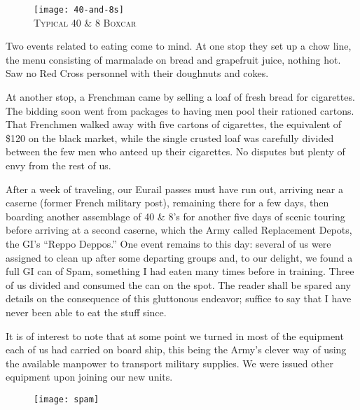 \documentclass[../m3y]{subfiles}
\begin{document}
\begin{figure}
\centering
\texttt{[image: 40-and-8s]}\\
\medskip
{\newtimes\textsc{Typical 40 \& 8 Boxcar}}
\end{figure}

Two events related to eating come to mind. At one stop they set up a chow line, the menu consisting of marmalade on bread and grapefruit juice, nothing hot. Saw no Red Cross personnel with their doughnuts and cokes.

At another stop, a Frenchman came by selling a loaf of fresh bread for cigarettes. The bidding soon went from packages to having men pool their rationed cartons. That  Frenchmen walked away with five cartons of cigarettes, the equivalent of \$120 on the black market, while the single crusted loaf was carefully divided between the few men who anteed up their cigarettes. No disputes but plenty of envy from the rest of us.

After a week of traveling, our Eurail passes must have run out, arriving near a caserne (former French military post), remaining there for a few days, then boarding another assemblage of 40 \& 8's for another five days of scenic touring before arriving at a second caserne, which the Army called Replacement Depots, the GI's ``Reppo Deppos.'' One event remains to this day: several of us were assigned to clean up after some departing groups and, to our delight, we found a full GI can of Spam, something I had eaten many times before in training. Three of us divided and consumed the can on the spot. The reader shall be spared any details on the consequence of this gluttonous endeavor; suffice to say that I have never been able to eat the stuff since.

It is of interest to note that at some point we turned in most of the equipment each of us had carried on board ship, this being the Army's clever way of using the available manpower to transport military supplies. We were issued other equipment upon joining our new units.

\bigskip
\begin{figure}[h]
\centering
\texttt{[image: spam]}\\
\end{figure}
\end{document}
